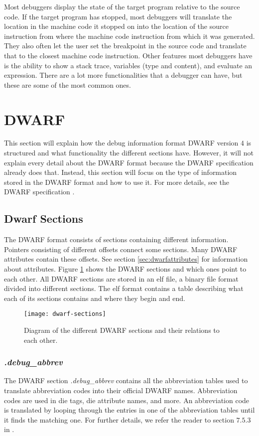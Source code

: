 Most debuggers display the state of the target program relative to the source code.
If the target program has stopped, most debuggers will translate the location in the machine code it stopped on into the location of the source instruction from where the machine code instruction from which it was generated.
They also often let the user set the breakpoint in the source code and translate that to the closest machine code instruction.
Other features most debuggers have is the ability to show a stack trace, variables (type and content), and evaluate an expression.
There are a lot more functionalities that a debugger can have, but these are some of the most common ones.


\section{DWARF}
\label{sec:dwarf}
This section will explain how the debug information format \acrfull{DWARF} version $4$ is structured and what functionality the different sections have.
However, it will not explain every detail about the \gls{DWARF} format because the \gls{DWARF} specification already does that.
Instead, this section will focus on the type of information stored in the \gls{DWARF} format and how to use it.
For more details, see the \gls{DWARF} specification \cite{dwarf}.


\subsection{Dwarf Sections}
The \gls{DWARF} format consists of sections containing different information.
Pointers consisting of different offsets connect some sections.
Many \gls{DWARF} attributes contain these offsets. See section \ref{sec:dwarfattributes} for information about attributes.
Figure \ref{fig:dwarfsections} shows the \gls{DWARF} sections and which ones point to each other.
All \gls{DWARF} sections are stored in an \gls{elf} file, a binary file format divided into different sections.
The \gls{elf} format contains a table describing what each of its sections contains and where they begin and end.


\begin{figure}[h]
	\centering
	\texttt{[image: dwarf-sections]}
	\caption{Diagram of the different \gls{DWARF} sections and their relations to each other.}
	\label{fig:dwarfsections}
\end{figure}


\subsubsection{\emph{.debug\_abbrev}}
The \gls{DWARF} section \emph{.debug\_abbrev} contains all the abbreviation tables used to translate abbreviation codes into their official \gls{DWARF} names.
Abbreviation codes are used in \acrfull{die} tags, \gls{die} attribute names, and more.
An abbreviation code is translated by looping through the entries in one of the abbreviation tables until it finds the matching one.
For further details, we refer the reader to section $7.5.3$ in \cite{dwarf}.



